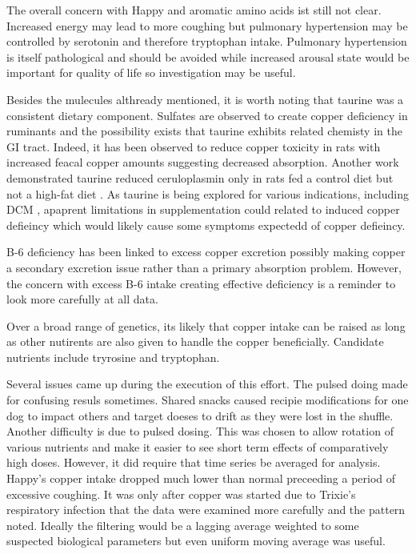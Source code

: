The overall concern with Happy and aromatic amino acids
ist still not clear. Increased energy may lead to more
coughing but 
pulmonary hypertension may be controlled by serotonin
\cite{PMID27927914} and therefore tryptophan intake. 
Pulmonary hypertension is itself pathological and
should be avoided while increased arousal state would
be important for quality of life so investigation may be useful. 

Besides the mulecules althready mentioned, it is worth
noting that taurine was a consistent dietary component.
Sulfates are observed to create copper deficiency in ruminants
and the possibility exists that taurine exhibits related chemisty
in the GI tract. Indeed, it has been observed to reduce
copper toxicity in rats with increased feacal copper
amounts \cite{PMID9609396} suggesting decreased
absorption. 
Another work demonstrated taurine reduced ceruloplasmin only
in rats fed a  control diet but not a high-fat diet
\cite{Krol2020}.
As taurine is being explored for various indications,
including DCM \cite{PMC9257265},
apaprent limitations in supplementation could  related
to induced copper defieincy which would likely cause some
symptoms expectedd of copper defieincy.


B-6 deficiency has been linked to excess copper excretion \cite{PMID7814236}
possibly making copper a secondary excretion issue
rather than a primary absorption problem. 
However, the concern with excess B-6 intake creating effective
deficiency is a reminder to look more carefully at all data. 

Over a broad range of genetics, its likely that copper intake
can be raised as long as other nutirents are also given
to handle the copper beneficially.
Candidate nutrients include tryrosine and tryptophan.



Several issues came up during the execution of this effort.
The pulsed doing made for confusing resuls sometimes.
Shared snacks caused recipie modifications for one dog
to impact others and target doeses to drift as they were
lost in the shuffle.
 Another difficulty is  due to pulsed dosing.
This was chosen to allow rotation of various
nutrients and make it easier to see short term effects
of comparatively high doses. However, it did require 
that time series be averaged  for analysis.
Happy's copper intake dropped much lower than normal
preceeding a period of excessive coughing. It was only
after copper was started due to Trixie's  respiratory infection
that the data were examined more carefully and the pattern
noted. Ideally the filtering would be a lagging average
weighted to some suspected biological parameters but
even uniform moving average was useful.   

